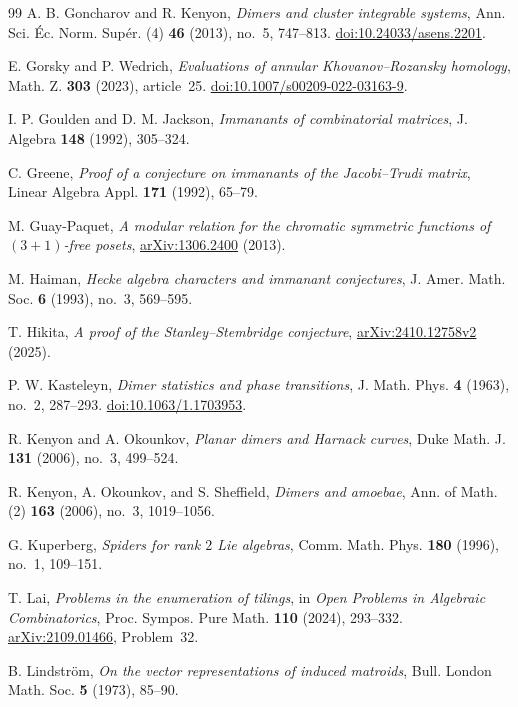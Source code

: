 \documentclass[11pt]{article}
\theoremstyle{definition}
\theoremstyle{remark}
\begin{document}
\begin{thebibliography}{99}
 A. B. Goncharov and R. Kenyon, \emph{Dimers and cluster integrable systems}, Ann. Sci. \'Ec. Norm. Sup\'er. (4) \textbf{46} (2013), no.~5, 747--813. \href{https://doi.org/10.24033/asens.2201}{doi:10.24033/asens.2201}.

 E. Gorsky and P. Wedrich, \emph{Evaluations of annular Khovanov--Rozansky homology}, Math. Z. \textbf{303} (2023), article~25. \href{https://doi.org/10.1007/s00209-022-03163-9}{doi:10.1007/s00209-022-03163-9}.

 I. P. Goulden and D. M. Jackson, \emph{Immanants of combinatorial matrices}, J. Algebra \textbf{148} (1992), 305--324.

 C. Greene, \emph{Proof of a conjecture on immanants of the Jacobi--Trudi matrix}, Linear Algebra Appl. \textbf{171} (1992), 65--79.

 M. Guay-Paquet, \emph{A modular relation for the chromatic symmetric functions of $(3+1)$-free posets}, \href{https://arxiv.org/abs/1306.2400}{arXiv:1306.2400} (2013).

 M. Haiman, \emph{Hecke algebra characters and immanant conjectures}, J. Amer. Math. Soc. \textbf{6} (1993), no.~3, 569--595.

 T. Hikita, \emph{A proof of the Stanley--Stembridge conjecture}, \href{https://arxiv.org/abs/2410.12758v2}{arXiv:2410.12758v2} (2025).

 P. W. Kasteleyn, \emph{Dimer statistics and phase transitions}, J. Math. Phys. \textbf{4} (1963), no.~2, 287--293. \href{https://doi.org/10.1063/1.1703953}{doi:10.1063/1.1703953}.

 R. Kenyon and A. Okounkov, \emph{Planar dimers and Harnack curves}, Duke Math. J. \textbf{131} (2006), no.~3, 499--524.

 R. Kenyon, A. Okounkov, and S. Sheffield, \emph{Dimers and amoebae}, Ann. of Math. (2) \textbf{163} (2006), no.~3, 1019--1056.

 G. Kuperberg, \emph{Spiders for rank $2$ Lie algebras}, Comm. Math. Phys. \textbf{180} (1996), no.~1, 109--151.

 T. Lai, \emph{Problems in the enumeration of tilings}, in \emph{Open Problems in Algebraic Combinatorics}, Proc. Sympos. Pure Math. \textbf{110} (2024), 293--332. \href{https://arxiv.org/abs/2109.01466}{arXiv:2109.01466}, Problem~32.

 B. Lindstr\"om, \emph{On the vector representations of induced matroids}, Bull. London Math. Soc. \textbf{5} (1973), 85--90.


\end{thebibliography}
\end{document}
